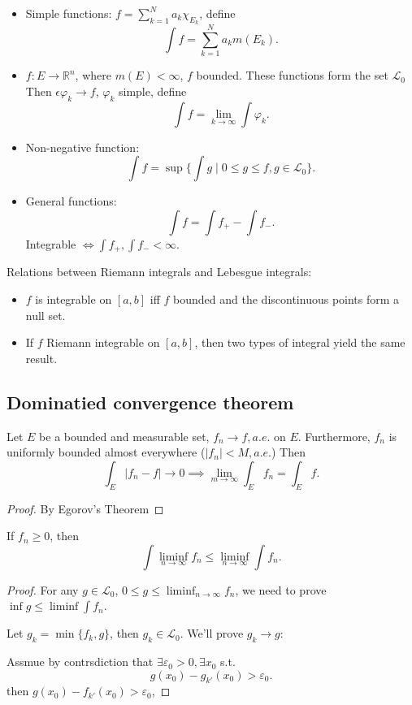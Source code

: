 \begin{itemize}
	\item Simple functions:
		$f=\sum_{k=1}^N a_k\chi_{E_k}$, define
		\[
			\int f = \sum_{k=1}^N a_km(E_k)
		.\]
	\item $f: E\to \mathbb{R}^n$, where $m(E)<\infty$, $f$ bounded.
		These functions form the set $\mathcal{L}_0$
		Then $\epsilon \varphi_k \to f$,  $\varphi_k$ simple, define
		 \[
		\int f = \lim_{k\to \infty}\int \varphi_k
        .\]
	\item Non-negative function:
		\[
			\int f = \sup \{\int g\mid 0\le g\le f, g\in \mathcal{L}_0\}
		.\]
	\item General functions:
		\[
		\int f = \int f_+ - \int f_-
		.\]
		Integrable $\iff \int f_+, \int f_- <\infty$.
\end{itemize}

Relations between Riemann integrals and Lebesgue integrals:
\begin{itemize}
	\item $f$ is integrable on $[a,b]$ iff
		$f$ bounded and the discontinuous points form a null set.
	\item If $f$ Riemann integrable on $[a,b]$, then
		two types of integral yield the same result.
\end{itemize}

\subsection{Dominatied convergence theorem}
\label{sub:Dominated convergence theorem}
\begin{theorem}
    Let $E$ be a bounded and measurable set, $f_n\to f, a.e.$ on $E$.
	Furthermore,  $f_n$ is uniformly bounded almost everywhere ($|f_n|<M,a.e.$)
	Then
	\[
	\int_E |f_n-f|\to 0 \implies \lim_{m\to \infty}\int_E f_n = \int_E f
	.\]
\end{theorem}
\begin{proof}[Proof]
    By Egorov's Theorem
\end{proof}

\begin{lemma}
	 If $f_n\ge 0$, then
	 \[
		 \int \liminf_{n\to \infty}f_n\le \liminf_{n\to \infty}\int f_n
	.\]
\end{lemma}
\begin{proof}[Proof]
	For any $g\in \mathcal{L}_0$, $0\le g\le \liminf_{n\to \infty} f_n$,
	we need to prove $\inf g\le \liminf \int f_n$. 

	Let $g_k=\min\{f_k, g\}$, then  $g_k\in \mathcal{L}_0$.
    We'll prove $g_k\to g$:

	Assmue by contrsdiction that  $\exists\varepsilon_0>0, \exists x_0$ s.t.
	\[
		g(x_0) - g_{k'}(x_0) > \varepsilon_0
	.\]
	then $g(x_0) - f_{k'}(x_0) > \varepsilon_0$,
\end{proof}

